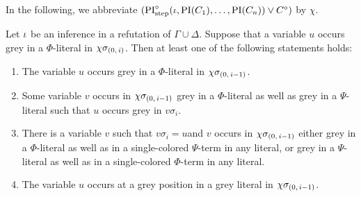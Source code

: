 \documentclass[,%
	draft=false,%
	numbers=noendperiod
	12pt,
	a4paper,
	oneside,%
	openany,
]{memoir}
\begin{document}
\clearpage
\newcommand{\inv}{\ensuremath{\chi}}

In the following, we abbreviate $(\operatorname{PI}^\circ_{\mathrm{step}}(\iota, \operatorname{PI}(C_1), \dots, \operatorname{PI}(C_n)) \lor C^\circ)$ by $\inv$.

\begin{lemma}
	Let $\iota$ be an inference in a refutation of $\Gamma\cup\Delta$.
	Suppose that a variable $u$ occurs grey in a $\Phi$-literal in $\inv\sigmazi$.
	Then at least one of the following statements holds:
	\begin{enumerate}
		\item
			\label{14_1}
			The variable $u$ occurs grey in a $\Phi$-literal in $\inv\sigmazmi$.

		\item 
			\label{14_2}
			Some variable $v$ occurs in $\inv\sigmazmi$ grey in a $\Phi$-literal as well as grey in a $\Psi$-literal such that $u$ occurs grey in $v\sigma_i$.

		\item 
			\label{14_3}
			There is a variable $v$ such that $v\sigma_i = u$\footnotemark and $v$ occurs in $\inv\sigmazmi$
			either grey in a $\Phi$-literal as well as in a single-colored $\Psi$-term in any literal, 
			or grey in a $\Psi$-literal as well as in a single-colored $\Phi$-term in any literal.

		\item
			\label{14_4}
			The variable $u$ occurs at a grey position in a grey literal in $\inv\sigmazmi$.

	\end{enumerate}
\end{lemma}
\end{document}
